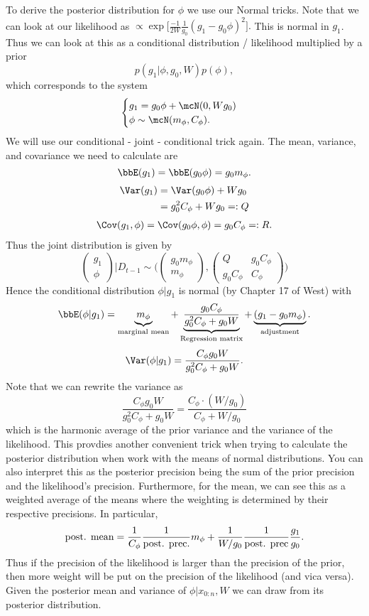 \documentclass{article}
\begin{document}
To derive the posterior distribution for $\phi$ we use our Normal tricks.  Note that we can look at our likelihood as
\(
\propto \exp \Big[ \frac{-1}{2W} \frac{1}{g_0} (g_1 - g_0 \phi)^2 \Big].
\)
This is normal in $g_1$.  Thus we can look at this as a conditional distribution / likelihood multiplied by a prior
\[
p(g_1 | \phi, g_0, W) p(\phi),
\]
which corresponds to the system
\[
\begin{cases}
g_1 = g_0 \phi + \mcN(0, W g_0) \\
\phi \sim \mcN(m_\phi, C_\phi).
\end{cases}
\]
We will use our conditional - joint - conditional trick again.  The mean, variance, and covariance we need to calculate are
\[
\bbE(g_1) = \bbE(g_0 \phi) = g_0 m_\phi.
\]
\begin{align*}
\Var (g_1) 
& = \Var (g_0 \phi) + W g_0 \\
& = g_0^2 C_\phi + W g_0 = : Q 
\end{align*}
\begin{align*}
\Cov(g_1, \phi) = \Cov( g_0 \phi, \phi) = g_0 C_\phi =: R.
\end{align*}
Thus the joint distribution is given by
\[
\begin{pmatrix}
g_1 \\
\phi
\end{pmatrix} | D_{t-1} 
\sim
\Big(
\begin{pmatrix}
g_0 m_\phi \\
m_\phi
\end{pmatrix} ,
\begin{pmatrix}
Q & g_0 C_\phi \\
g_0 C_\phi & C_\phi
\end{pmatrix}
\Big)
\]
Hence the conditional distribution $\phi | g_1$ is normal (by Chapter 17 of West) with
\[
\bbE(\phi | g_1) = 
\underbrace{m_\phi}_{\textmd{marginal mean}} + 
\underbrace{\frac{g_0 C_\phi}{g_0^2 C_\phi + g_0 W}}_{\textmd{Regression matrix}} +
\underbrace{(g_1 - g_0 m_\phi)}_{\textmd{ adjustment }}. 
\]
\[
\Var(\phi | g_1) = \frac{C_\phi g_0 W}{g_0^2 C_\phi + g_0 W}.
\]
Note that we can rewrite the variance as
\[
\frac{C_\phi g_0 W}{g_0^2 C_\phi + g_0 W} 
=
\frac{C_\phi \cdot (W/g_0) }{C_\phi + W/g_0} 
\]
which is the harmonic average of the prior variance and the variance of the likelihood.  This provdies another convenient trick when trying to calculate the posterior distribution when work with the means of normal distributions.  You can also interpret this as the posterior precision being the sum of the prior precision and the likelihood's precision.  Furthermore, for the mean, we can see this as a weighted average of the means where the weighting is determined by their respective precisions.  In particular,
\[
\textmd{post. mean} = \frac{1}{C_\phi} \frac{1}{\textmd{post. prec.}} m_\phi + \frac{1}{W/g_0} \frac{1}{\textmd{post. prec}} \frac{g_1}{g_0}.
\]
Thus if the precision of the likelihood is larger than the precision of the prior, then more weight will be put on the precision of the likelihood (and vica versa).  Given the posterior mean and variance of $\phi | x_{0:n}, W$ we can draw from its posterior distribution.
\end{document}
